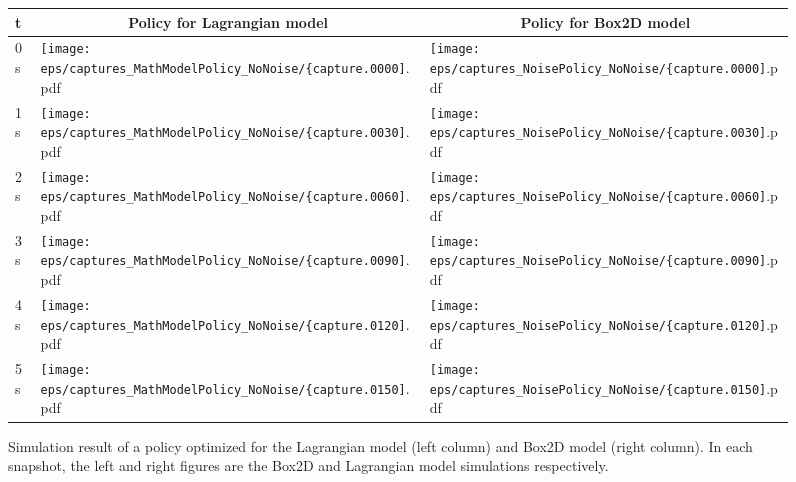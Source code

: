 \setlength{\figw}{33mm}
\begin{figure}[tb]
\begin{center}
\begin{tabular}{|l|m{\figw}|m{\figw}|}
\hline
t & \multicolumn{1}{c|}{\footnotesize Policy for Lagrangian model} 
 & \multicolumn{1}{c|}{\footnotesize Policy for Box2D model}\\\hline
0s &
\texttt{[image: eps/captures\_MathModelPolicy\_NoNoise/\{capture.0000]}.pdf} &
\texttt{[image: eps/captures\_NoisePolicy\_NoNoise/\{capture.0000]}.pdf}\\
1s &
\texttt{[image: eps/captures\_MathModelPolicy\_NoNoise/\{capture.0030]}.pdf} &
\texttt{[image: eps/captures\_NoisePolicy\_NoNoise/\{capture.0030]}.pdf}\\
2s &
\texttt{[image: eps/captures\_MathModelPolicy\_NoNoise/\{capture.0060]}.pdf} &
\texttt{[image: eps/captures\_NoisePolicy\_NoNoise/\{capture.0060]}.pdf}\\
3s &
\texttt{[image: eps/captures\_MathModelPolicy\_NoNoise/\{capture.0090]}.pdf} &
\texttt{[image: eps/captures\_NoisePolicy\_NoNoise/\{capture.0090]}.pdf}\\
4s &
\texttt{[image: eps/captures\_MathModelPolicy\_NoNoise/\{capture.0120]}.pdf} &
\texttt{[image: eps/captures\_NoisePolicy\_NoNoise/\{capture.0120]}.pdf}\\
5s &
\texttt{[image: eps/captures\_MathModelPolicy\_NoNoise/\{capture.0150]}.pdf} &
\texttt{[image: eps/captures\_NoisePolicy\_NoNoise/\{capture.0150]}.pdf}\\\hline
\end{tabular}
\caption{Simulation result of a policy optimized for the Lagrangian
 model (left column) and Box2D model (right column).  In each snapshot,
 the left and right figures are the Box2D and Lagrangian model
 simulations respectively.}
\label{fig:learning_example-math-sim}
\end{center}
\end{figure}

